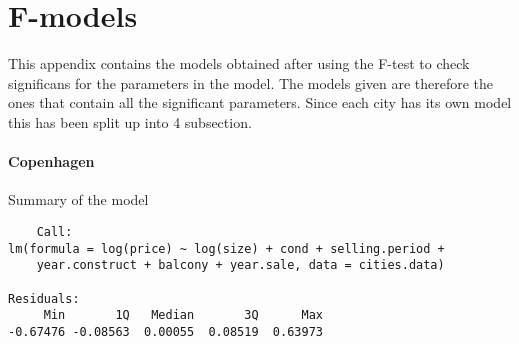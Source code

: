 \chapter{F-models}

This appendix contains the models obtained after using the F-test to check significans for the parameters in the model. 
The models given are therefore the ones that contain all the significant parameters.
Since each city has its own model this has been split up into 4 subsection. 

\subsubsection{Copenhagen}
Summary of the model

\begin{lstlisting}
    Call:
lm(formula = log(price) ~ log(size) + cond + selling.period + 
    year.construct + balcony + year.sale, data = cities.data)

Residuals:
     Min       1Q   Median       3Q      Max 
-0.67476 -0.08563  0.00055  0.08519  0.63973 


\end{lstlisting}
